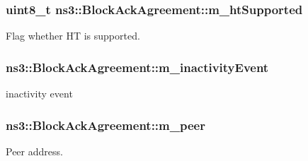 \subsubsection[{\texorpdfstring{m\+\_\+ht\+Supported}{m_htSupported}}]{\setlength{\rightskip}{0pt plus 5cm}uint8\+\_\+t ns3\+::\+Block\+Ack\+Agreement\+::m\+\_\+ht\+Supported\hspace{0.3cm}{\ttfamily [protected]}}\hypertarget{classns3_1_1BlockAckAgreement_a39fbdfcddd363ac4b0edc69f6af4a688}{}\label{classns3_1_1BlockAckAgreement_a39fbdfcddd363ac4b0edc69f6af4a688}


Flag whether HT is supported. 

\subsubsection[{\texorpdfstring{m\+\_\+inactivity\+Event}{m_inactivityEvent}}]{ ns3\+::\+Block\+Ack\+Agreement\+::m\+\_\+inactivity\+Event\hspace{0.3cm}{\ttfamily [protected]}}\hypertarget{classns3_1_1BlockAckAgreement_a74bb7967b40a43fad114a73af35dcabc}{}\label{classns3_1_1BlockAckAgreement_a74bb7967b40a43fad114a73af35dcabc}


inactivity event 

\subsubsection[{\texorpdfstring{m\+\_\+peer}{m_peer}}]{ ns3\+::\+Block\+Ack\+Agreement\+::m\+\_\+peer\hspace{0.3cm}{\ttfamily [protected]}}\hypertarget{classns3_1_1BlockAckAgreement_a132df940ae22c624bf2a44e3a2cc8874}{}\label{classns3_1_1BlockAckAgreement_a132df940ae22c624bf2a44e3a2cc8874}


Peer address. 

